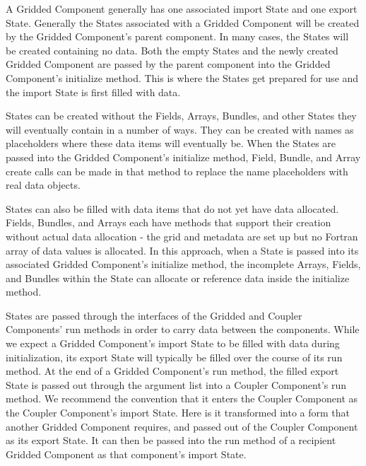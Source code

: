 %


A Gridded Component generally has one associated import 
State and one export State.  Generally the States 
associated with a Gridded Component will be created by 
the Gridded Component's parent component.
In many cases, the States will be created containing 
no data.  Both the empty States and the
newly created Gridded Component are passed
by the parent component into the Gridded Component's initialize 
method.  This is where the States get prepared for use 
and the import State is first filled with data.

States can be created without the Fields, Arrays, Bundles,
and other States they will eventually contain in a number 
of ways.  They can be created with names as placeholders where 
these data items will eventually be.  When the States are passed 
into the Gridded Component's initialize method, Field,
Bundle, and Array create calls can be made in that method
to replace the name placeholders with real data objects.

States can also be filled with data items that do not yet 
have data allocated.  Fields, Bundles, and Arrays each have 
methods that support their creation without actual data 
allocation - the grid and metadata are set up but no
Fortran array of data values is allocated.  In this approach, 
when a State is passed into its associated Gridded Component's 
initialize method, the incomplete Arrays, Fields, and 
Bundles within the State can allocate or reference data 
inside the initialize method.

States are passed through the interfaces of the Gridded 
and Coupler Components' run methods in order to carry data 
between the components.  While we expect
a Gridded Component's import State to be filled with data 
during initialization, its export State will typically be
filled over the course of its run method.  At the end of
a Gridded Component's run method, the filled export State 
is passed out through the argument list into a Coupler 
Component's run method.  We recommend the convention that 
it enters the Coupler Component as the Coupler Component's
import State.  Here is it transformed into a form
that another Gridded Component requires, and passed out
of the Coupler Component as its export State.  It can then
be passed into the run method of a recipient Gridded Component
as that component's import State.

